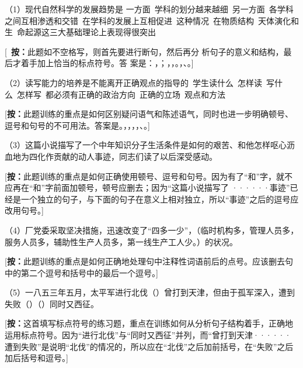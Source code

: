 （1）现代自然科学的发展趋势是
一方面\ 
学科的划分越来越细\ 
另一方面\ 
各学科之间互相渗透和交错\ 
在学科的发展上互相促进\ 
这种情况\ 
在物质结构\ 
天体演化和生\ 
命起源这三大基础理论上表现得很突出

[\ \textbf{按：}此题如不空格写，则首先要进行断句，然后再分
析句子的意义和结构，最后才着手加上恰当的标点符号。答
案是：，；，，。，、。]

（2）读写能力的培养是不能离开正确观点的指导的\ 
学生读什么\ 
怎样读\ 
写什么\ 
怎样写\ 
都必须有正确的政治方向\ 
正确的立场\ 
观点和方法

[\textbf{按：}此题训练的重点是如何区别疑问语气和陈述语气，同时也进一步明确顿号、逗号和句号的不可用法。答案是。，，，，、。]

（3）这篇小说描写了一个中年知识分子生活条件是如何的艰苦、和他怎样呕心沥血地为四化作贡献的动人事迹，同志们读了以后深受感动。

[\textbf{按：}此题训练的重点是如何正确使用顿号、逗号和句号。因为有了“和”字，就不应再在“和”字前面加顿号，顿号应删去；因为“这篇小说描写了
······事迹”已经是一个独立的句子，与下面的句子在意义上相对独立，所以“事迹”之后的逗号应改用句号。]

（4）厂党委采取坚决措施，迅速改变了“四多一少”，（临时机构多，管理人员多，服务人员多，辅助性生产人员多，第一线生产工人少。）的状况。

[\textbf{按：}此题训练的重点是如何正确地处理句中注释性词语前后的点号。应该删去句中的第二个逗号和括号中的最后一个逗号。]

（5）一八五三年五月，太平军进行北伐（）曾打到天津，但由于孤军深入，遭到失败（）（）同时又西征。

[\textbf{按：}这首填写标点符号的练习题，重点在训练如何从分析句子结构着手，正确地运用标点符号。因为“进行北伐”与“同时又西征”并列，而“曾打到天津······遭到失败”是说明“北伐”的情况的，所以应在“北伐”之后加前括号，在“失败”之后加后括号和逗号。]
\newpage